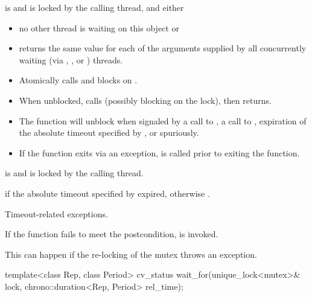 \begin{itemdescr}
\pnum
\expects
{} is  and 
is locked by the calling thread, and either
\begin{itemize}
\item no other thread is waiting on this  object or
\item {} returns the same value for each of the 
arguments supplied by all concurrently waiting (via ,
, or ) threads.
\end{itemize}

\pnum
\effects
\begin{itemize}
\item
Atomically calls  and blocks on .

\item
When unblocked, calls  (possibly blocking on the lock), then returns.

\item
The function will unblock when signaled by a call to , a call to ,
expiration of the absolute timeout specified by ,
or spuriously.

\item
If the function exits via an exception,  is called prior to exiting the function.
\end{itemize}

\pnum
\ensures
{} is  and 
is locked by the calling thread.

\pnum
\returns
{} if
the absolute timeout specified by  expired,
otherwise .

\pnum
\throws
Timeout-related
exceptions.

\pnum
\remarks
If the function fails to meet the postcondition, 
is invoked.
\begin{note}
This can happen if the re-locking of the mutex throws an exception.
\end{note}
\end{itemdescr}

%
\begin{itemdecl}
template<class Rep, class Period>
  cv_status wait_for(unique_lock<mutex>& lock,
                     chrono::duration<Rep, Period> rel_time);
\end{itemdecl}

